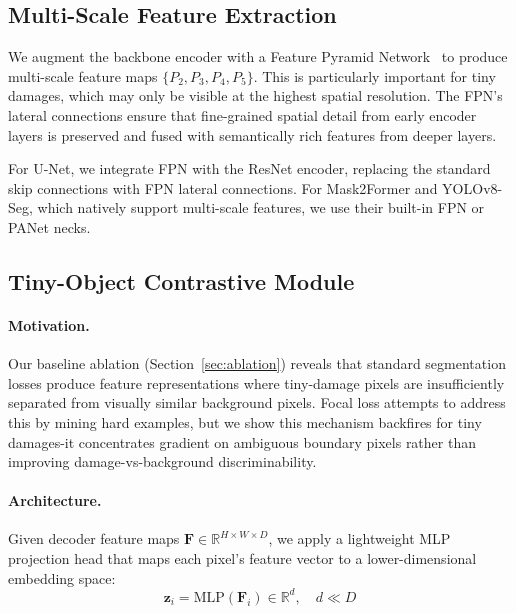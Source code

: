 \documentclass[10pt,twocolumn]{article}
\begin{document}
\subsection{Multi-Scale Feature Extraction}

We augment the backbone encoder with a Feature Pyramid Network~\cite{lin2017fpn} to produce multi-scale feature maps $\{P_2, P_3, P_4, P_5\}$. This is particularly important for tiny damages, which may only be visible at the highest spatial resolution. The FPN's lateral connections ensure that fine-grained spatial detail from early encoder layers is preserved and fused with semantically rich features from deeper layers.

For U-Net, we integrate FPN with the ResNet encoder, replacing the standard skip connections with FPN lateral connections. For Mask2Former and YOLOv8-Seg, which natively support multi-scale features, we use their built-in FPN or PANet necks.

\subsection{Tiny-Object Contrastive Module}

\paragraph{Motivation.} Our baseline ablation (Section~\ref{sec:ablation}) reveals that standard segmentation losses produce feature representations where tiny-damage pixels are insufficiently separated from visually similar background pixels. Focal loss attempts to address this by mining hard examples, but we show this mechanism backfires for tiny damages-it concentrates gradient on ambiguous boundary pixels rather than improving damage-vs-background discriminability.

\paragraph{Architecture.} Given decoder feature maps $\mathbf{F} \in \mathbb{R}^{H \times W \times D}$, we apply a lightweight MLP projection head that maps each pixel's feature vector to a lower-dimensional embedding space:
\begin{equation}
    \mathbf{z}_i = \text{MLP}(\mathbf{F}_i) \in \mathbb{R}^d, \quad d \ll D
\end{equation}
\end{document}
